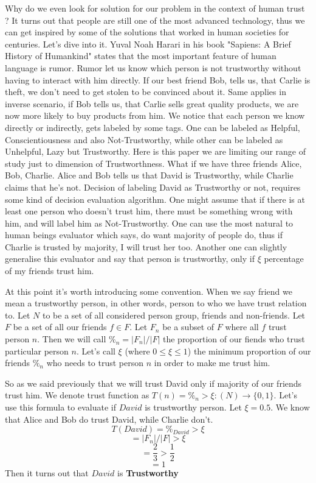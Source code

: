 \documentclass[nostrict]{szablonPG}
\begin{document}
Why do we even look for solution for our problem in the context of human trust ? It turns out that people are still one of the most advanced technology, thus we can get inspired by some of the solutions that worked in human societies for centuries. Let's dive into it.
Yuval Noah Harari in his book "Sapiens: A Brief History of Humankind" states that the most important feature of human language is rumor. Rumor let us know which person is not trustworthy without having to interact with him directly. If our best friend Bob, tells us, that Carlie is theft, we don't need to get stolen to be convinced about it. Same applies in inverse scenario, if Bob tells us, that Carlie sells great quality products, we are now more likely to buy products from him. We notice that each person we know directly or indirectly, gets labeled by some tags. One can be labeled as Helpful, Conscientiousness and also Not-Trustworthy, while other can be labeled as Unhelpful, Lazy but Trustworthy. Here is this paper we are limiting our range of study just to dimension of Trustworthness.
What if we have three friends Alice, Bob, Charlie. Alice and  Bob tells us that David is Trustworthy, while Charlie claims that he's not. Decision of labeling David as Trustworthy or not, requires some kind of decision evaluation algorithm.
One might assume that if there is at least one person who doesn't trust him, there must be something wrong with him, and will label him as Not-Trustworthy. One can use the most natural to human beings evaluator which says, do want majority of people do, thus if Charlie is trusted by majority, I will trust her too. Another one can slightly generalise this evaluator and say that person is trustworthy, only if $\xi$ percentage of my friends trust him. 

At this point it's worth introducing some convention. When we say friend we mean a trustworthy person, in other words, person to who we have trust relation to. Let $N$ to be a set of all considered person group, friends and non-friends. Let $F$ be a set of all our friends $f \in F$. Let $F_n$ be a subset of $F$ where all $f$ trust person $n$. Then we will call $\%_n = |F_n|/|F|$ the proportion of our fiends who trust particular person $n$. Let's call $\xi$ (where $0 \le \xi \leq 1$) the minimum proportion of our friends $\%_n$ who needs to trust person $n$ in order to make me trust him. 

So as we said previously that we will trust David only if majority of our friends trust him. We denote trust function as $T(n) = \%_n > \xi : (N) \rightarrow \{0,1\}$. 
Let's use this formula to evaluate if $David$ is trustworthy person. Let $\xi = 0.5$. We know that Alice and Bob do trust David, while Charlie don't.
\[T(David) = \%_{David} > \xi\]
\[= |F_n|/|F| > \xi\]
\[= \frac{2}{3} > \frac{1}{2}\]
\[= 1\]
Then it turns out that $David$ is \textbf{Trustworthy}
\end{document}
